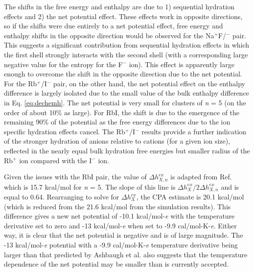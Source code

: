 \begin{cpa}
  The shifts in the free energy and enthalpy are due to 1) sequential hydration effects and 2) the net potential effect. These effects work in opposite directions, so if the shifts 
  were due entirely to a net potential effect, free energy and enthalpy shifts in the opposite direction would be observed for the Na$^+$F/$^-$ pair. This suggests a significant 
  contribution from sequential hydration effects in which the first shell strongly interacts with the second shell (with a corresponding large negative value for the entropy for the
  F$^-$ ion). This effect is apparently large enough to overcome the shift in the opposite direction due to the net potential. For the Rb$^+$/I$^-$ pair, on the other hand, the net 
  potential effect on the enthalpy difference is largely isolated due to the small value of the bulk enthalpy difference in Eq. \ref{eq:dechemh}. The net potential is very small for
  clusters of \emph{n} = 5 (on the order of about 10\% as large). For RbI, the shift is due to the emergence of the remaining 90\% of the potential as the free energy differences 
  due to the ion specific hydration effects cancel. The Rb$^+$/I$^-$ results provide a further indication of the stronger hydration of anions relative to cations (for a given ion 
  size), reflected in the nearly equal bulk hydration free energies but smaller radius of the Rb$^+$ ion compared with the I$^-$ ion. 
  
  Given the issues with the RbI pair, the value of $\Delta h^{ex}_{X,n}$ is adapted from Ref. \cite{coe1998cpa1} which is 15.7 kcal/mol for \emph{n} = 5. The slope of this line is
  $\Delta h^{ex}_{X}/2\Delta h^{ex}_{X,n}$ and is equal to 0.64. Rearranging to solve for $\Delta h^{ex}_{X}$, the CPA estimate is 20.1 kcal/mol (which is reduced from the 21.6 
  kcal/mol from the simulation results). This difference gives a new net potential of -10.1 kcal/mol-\emph{e} with the temperature derivative set to zero and -13 kcal/mol-\emph{e}
  when set to -9.9 cal/mol-K-\emph{e}. Either way, it is clear that the net potential is negative and is of large magnitude. The -13 kcal/mol-\emph{e} potential with a -9.9 cal/mol-K-\emph{e}
  temperature derivative being larger than that predicted by Ashbaugh et al.\cite{ashbaugh2008lps} also suggests that the temperature dependence of the net potential may be smaller 
  than is currently accepted\cite{randles1977structure,hunenberger2011sp}.


\end{cpa}
